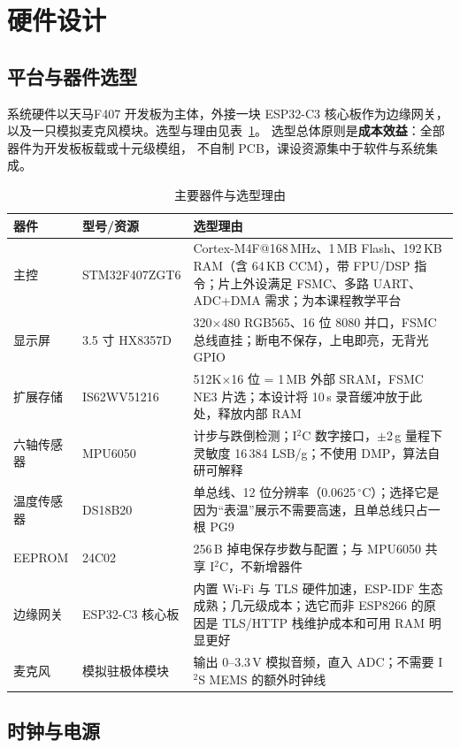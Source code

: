 \section{硬件设计}

\subsection{平台与器件选型}
系统硬件以天马F407 开发板为主体，外接一块 ESP32-C3 核心板作为边缘网关，
以及一只模拟麦克风模块。选型与理由见表~\ref{tab:parts}。
选型总体原则是\textbf{成本效益}：全部器件为开发板板载或十元级模组，
不自制 PCB，课设资源集中于软件与系统集成。

\begin{table}[htbp]
\centering\small
\caption{主要器件与选型理由}\label{tab:parts}
\begin{tabular}{@{}p{2.6cm}p{3.4cm}p{7.4cm}@{}}
\toprule
器件 & 型号/资源 & 选型理由\\
\midrule
主控 & STM32F407ZGT6 & Cortex-M4F@168\,MHz、1\,MB Flash、192\,KB RAM（含 64\,KB CCM），带 FPU/DSP 指令；片上外设满足 FSMC、多路 UART、ADC+DMA 需求；为本课程教学平台\\
显示屏 & 3.5 寸 HX8357D & 320$\times$480 RGB565、16 位 8080 并口，FSMC 总线直挂；断电不保存，上电即亮，无背光 GPIO\\
扩展存储 & IS62WV51216 & 512K$\times$16 位 = 1\,MB 外部 SRAM，FSMC NE3 片选；本设计将 10\,s 录音缓冲放于此处，释放内部 RAM\\
六轴传感器 & MPU6050 & 计步与跌倒检测；I$^2$C 数字接口，$\pm$2\,g 量程下灵敏度 16\,384 LSB/g；不使用 DMP，算法自研可解释\\
温度传感器 & DS18B20 & 单总线、12 位分辨率（0.0625\,$^\circ$C）；选择它是因为``表温''展示不需要高速，且单总线只占一根 PG9\\
EEPROM & 24C02 & 256\,B 掉电保存步数与配置；与 MPU6050 共享 I$^2$C，不新增器件\\
边缘网关 & ESP32-C3 核心板 & 内置 Wi-Fi 与 TLS 硬件加速，ESP-IDF 生态成熟；几元级成本；选它而非 ESP8266 的原因是 TLS/HTTP 栈维护成本和可用 RAM 明显更好\\
麦克风 & 模拟驻极体模块 & 输出 0--3.3\,V 模拟音频，直入 ADC；不需要 I$^2$S MEMS 的额外时钟线\\
\bottomrule
\end{tabular}
\end{table}

\subsection{时钟与电源}
